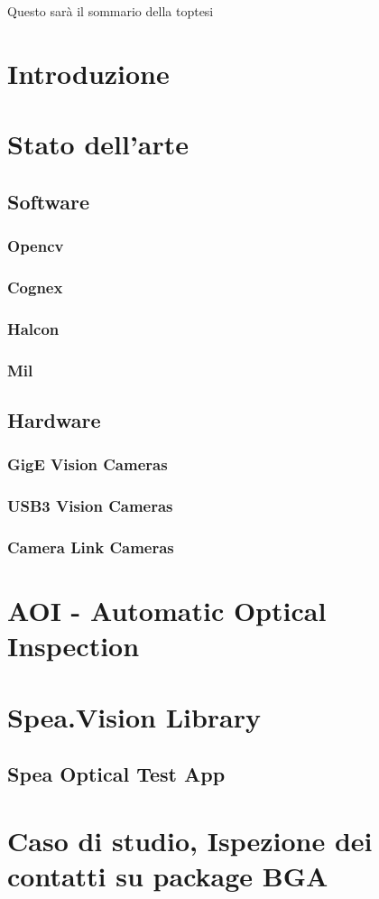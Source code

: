 \documentclass[11pt,a4paper,twoside,oldstyle,classica,italian]{toptesi}
\begin{document}
\frontespizio
\sommario
Questo sarà il sommario della toptesi

\indici

\chapter{Introduzione}

\chapter{Stato dell'arte}

\section{Software}
\subsection{Opencv}
\subsection{Cognex}
\subsection{Halcon}
\subsection{Mil}

\section{Hardware}
\subsection{GigE Vision Cameras}
\subsection{USB3 Vision Cameras}
\subsection{Camera Link Cameras}

\chapter{AOI - Automatic Optical Inspection}

\chapter{Spea.Vision Library}

\section{Spea Optical Test App}

\chapter{Caso di studio, Ispezione dei contatti su package BGA}

\end{document}
